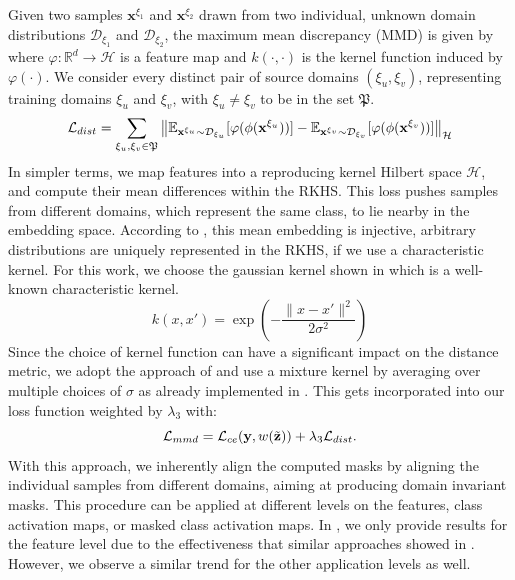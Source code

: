 Given two samples $\mathbf{x}^{\xi_1}$ and $\mathbf{x}^{\xi_2}$ drawn from two individual, unknown  domain distributions $\mathcal{D}_{\xi_1}$ and $\mathcal{D}_{\xi_2}$, the maximum mean discrepancy (MMD) is given by  where $\varphi: \mathbb{R}^{d} \rightarrow \mathcal{H}$ is a feature map and $k(\cdot, \cdot)$ is the kernel function induced by $\varphi(\cdot)$. We consider every distinct pair of source domains $(\xi_u, \xi_v)$, representing training domains $\xi_u$ and $\xi_v$, with $\xi_u\neq \xi_v$ to be in the set $\mathfrak{P}$.
\begin{equation}
\label{eq:mmd_maps}
    \mathcal{L}_{dist} =\sum_{\xi_u,\xi_v \in \mathfrak{P}}\left\|\mathbb{E}_{\mathbf{x}^{\xi_u} \sim \mathcal{D}_{\xi_u}}[\varphi(\phi(\mathbf{x}^{\xi_u}))]-\mathbb{E}_{\mathbf{x}^{\xi_v} \sim \mathcal{D}_{\xi_v}}[\varphi(\phi(\mathbf{x}^{\xi_v}))]\right\|_{\mathcal{H}}
\end{equation}
In simpler terms, we map features into a reproducing kernel Hilbert space $\mathcal{H}$, and compute their mean differences within the RKHS. This loss pushes samples from different domains, which represent the same class, to lie nearby in the embedding space. According to \citet{SriperumbudurFGLS09}, this mean embedding is injective, \ie arbitrary distributions are uniquely represented in the RKHS, if we use a characteristic kernel. For this work, we choose the gaussian kernel shown in  which is a well-known characteristic kernel.
\begin{equation}
\label{eq:gaussian_kernel}
    k(x,x') = \exp \left(-\frac{\|x-x'\|^{2}}{2 \sigma^{2}}\right)
\end{equation}
Since the choice of kernel function can have a significant impact on the distance metric, we adopt the approach of \citet{LiPWK18} and use a mixture kernel by averaging over multiple choices of $\sigma$ as already implemented in \domainbed. This gets incorporated into our loss function weighted by $\lambda_3$ with:
\begin{equation}
    \mathcal{L}_{mmd} = \mathcal{L}_{ce}(\mathbf{y}, w(\Tilde{\mathbf{z}}))+\lambda_3 \mathcal{L}_{dist}.
\end{equation}
With this approach, we inherently align the computed masks by aligning the individual samples from different domains, aiming at producing domain invariant masks. This procedure can be applied at different levels \eg on the features, class activation maps, or masked class activation maps. In , we only provide results for the feature level due to the effectiveness that similar approaches showed in \domainbed. However, we observe a similar trend for the other application levels as well.

